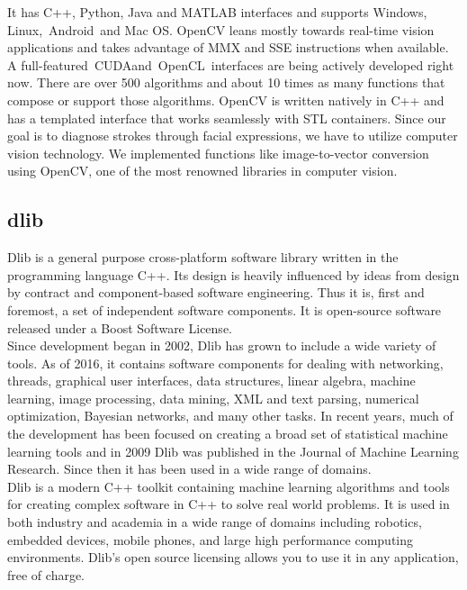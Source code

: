 It has C++, Python, Java and MATLAB interfaces and supports Windows, Linux, Android and Mac OS. OpenCV leans mostly towards real-time vision applications and takes advantage of MMX and SSE instructions when available. A full-featured CUDAand OpenCL interfaces are being actively developed right now. There are over 500 algorithms and about 10 times as many functions that compose or support those algorithms. OpenCV is written natively in C++ and has a templated interface that works seamlessly with STL containers. Since our goal is to diagnose strokes through facial expressions, we have to utilize computer vision technology. We implemented functions like image-to-vector conversion using OpenCV, one of the most renowned libraries in computer vision.
\\


\subsection{\textbf{dlib}}
\cite{dlib} Dlib is a general purpose cross-platform software library written in the programming language C++. Its design is heavily influenced by ideas from design by contract and component-based software engineering. Thus it is, first and foremost, a set of independent software components. It is open-source software released under a Boost Software License.
\\

Since development began in 2002, Dlib has grown to include a wide variety of tools. As of 2016, it contains software components for dealing with networking, threads, graphical user interfaces, data structures, linear algebra, machine learning, image processing, data mining, XML and text parsing, numerical optimization, Bayesian networks, and many other tasks. In recent years, much of the development has been focused on creating a broad set of statistical machine learning tools and in 2009 Dlib was published in the Journal of Machine Learning Research. Since then it has been used in a wide range of domains. 
\\

Dlib is a modern C++ toolkit containing machine learning algorithms and tools for creating complex software in C++ to solve real world problems. It is used in both industry and academia in a wide range of domains including robotics, embedded devices, mobile phones, and large high performance computing environments. Dlib's open source licensing allows you to use it in any application, free of charge.
\\

